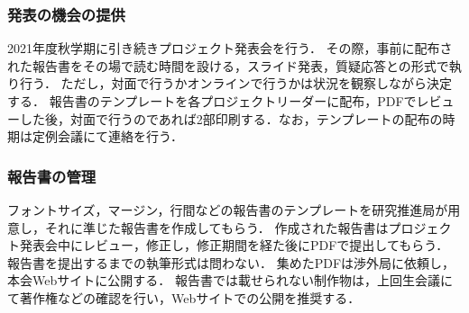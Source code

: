 \subsubsection*{発表の機会の提供}

2021年度秋学期に引き続きプロジェクト発表会を行う．
その際，事前に配布された報告書をその場で読む時間を設ける，スライド発表，質疑応答との形式で執り行う．
ただし，対面で行うかオンラインで行うかは状況を観察しながら決定する．
報告書のテンプレートを各プロジェクトリーダーに配布，PDFでレビューした後，対面で行うのであれば2部印刷する．なお，テンプレートの配布の時期は定例会議にて連絡を行う．


\subsubsection*{報告書の管理}

フォントサイズ，マージン，行間などの報告書のテンプレートを研究推進局が用意し，それに準じた報告書を作成してもらう．
作成された報告書はプロジェクト発表会中にレビュー，修正し，修正期間を経た後にPDFで提出してもらう．
報告書を提出するまでの執筆形式は問わない．
集めたPDFは渉外局に依頼し，本会Webサイトに公開する．
報告書では載せられない制作物は，上回生会議にて著作権などの確認を行い，Webサイトでの公開を推奨する．
